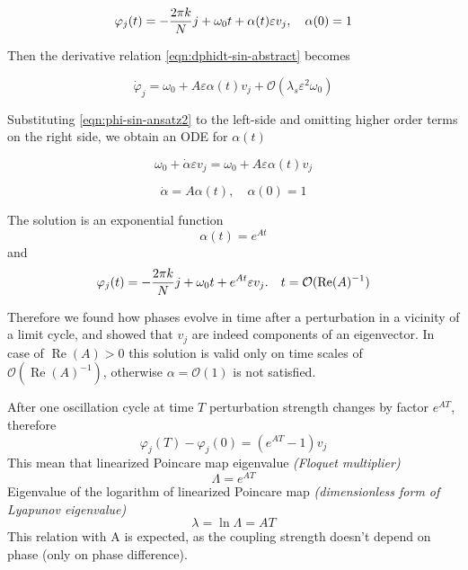 \documentclass[a4paper,12pt]{article}
\renewcommand{\Re}{\operatorname{Re}}
\newcommand{\eps}{\varepsilon}
\newcommand{\bigO}{\mathcal{O}}
\begin{document}
\begin{equation}
\varphi_j(t) = -  \fr{k}{j} + \omega_0 t + \alpha(t) \eps v_j, \quad \alpha(0) = 1
\label{eqn:phi-sin-ansatz2}
\end{equation}

Then the derivative relation \eqref{eqn:dphidt-sin-abstract} becomes

\begin{equation}
\dot \varphi_j  = \omega_0 + A \eps \alpha(t)  v_j + \bigO(\lambda_s \eps ^2  \omega_0)
\end{equation}

Substituting \eqref{eqn:phi-sin-ansatz2} to the left-side and omitting higher order terms on the right side, we obtain an ODE for $\alpha(t)$

\begin{equation}
\omega_0 + \dot \alpha \eps v_j  = \omega_0  + A \eps \alpha(t)  v_j 
\end{equation}

\begin{equation}
\dot \alpha  = A \alpha(t), \quad \alpha(0) = 1
\end{equation}

The solution is an exponential function
\begin{equation}
\alpha(t) = e^{A t}
\end{equation}
and 
\begin{equation}
\varphi_j(t)  =  -  \fr{k}{j} + \omega_0 t +  e^{A t}  \eps v_j.
\quad t = \bigO(\Re(A)^{-1})
\end{equation}

Therefore we found how phases evolve in time after a perturbation in a vicinity of a limit cycle, and showed that $v_j$ are indeed components of an eigenvector. 
In case of $\Re(A) > 0$ this solution is valid only on time scales of $\bigO(\Re(A)^{-1})$, otherwise $\alpha = \bigO(1)$ is not satisfied.

After one oscillation cycle at time $T$ perturbation strength changes by factor $e^{AT}$, therefore
\begin{equation}
\varphi_j(T) - \varphi_j(0) = (e^{AT} - 1) v_j
\end{equation}
This mean that linearized Poincare map eigenvalue \textit{(Floquet multiplier)}
$$
\Lambda = e^{A T}
$$
Eigenvalue of the logarithm of linearized Poincare map \textit{(dimensionless form of Lyapunov eigenvalue)}
$$
\lambda = \ln \Lambda = A T
$$
This relation with A is expected, as the coupling strength doesn't depend on phase (only on phase difference).
\end{document}

